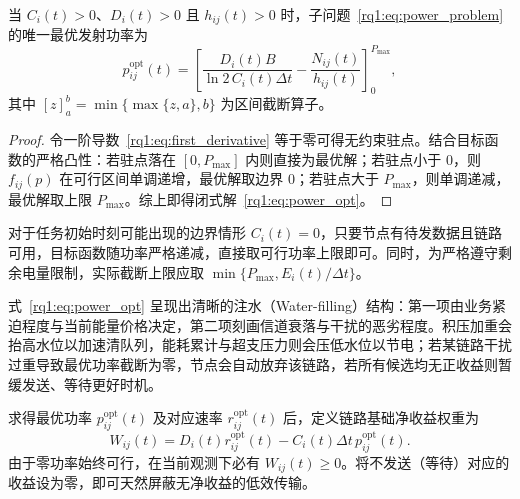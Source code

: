 \begin{proposition}[固定干扰下的链路功率最优解]
\label{rq1:prop:power}
当 $C_i(t)>0$、$D_i(t)>0$ 且 $h_{ij}(t)>0$ 时，子问题~\eqref{rq1:eq:power_problem} 的唯一最优发射功率为
\begin{equation}
 p_{ij}^{\mathrm{opt}}(t)=
 \left[\frac{D_i(t)B}{\ln2\,C_i(t)\Delta t}
            -\frac{N_{ij}(t)}{h_{ij}(t)}\right]_{0}^{P_{\max}},
 \label{rq1:eq:power_opt}
\end{equation}
其中 $[z]_{a}^{b}=\min\{\max\{z,a\},b\}$ 为区间截断算子。
\end{proposition}
\begin{proof}
令一阶导数~\eqref{rq1:eq:first_derivative} 等于零可得无约束驻点。结合目标函数的严格凸性：若驻点落在 $[0,P_{\max}]$ 内则直接为最优解；若驻点小于 $0$，则 $f_{ij}(p)$ 在可行区间单调递增，最优解取边界 $0$；若驻点大于 $P_{\max}$，则单调递减，最优解取上限 $P_{\max}$。综上即得闭式解~\eqref{rq1:eq:power_opt}。
\end{proof}

对于任务初始时刻可能出现的边界情形 $C_i(t)=0$，只要节点有待发数据且链路可用，目标函数随功率严格递减，直接取可行功率上限即可。同时，为严格遵守剩余电量限制，实际截断上限应取 $\min\{P_{\max},E_i(t)/\Delta t\}$。

式~\eqref{rq1:eq:power_opt} 呈现出清晰的注水（Water-filling）结构：第一项由业务紧迫程度与当前能量价格决定，第二项刻画信道衰落与干扰的恶劣程度。积压加重会抬高水位以加速清队列，能耗累计与超支压力则会压低水位以节电；若某链路干扰过重导致最优功率截断为零，节点会自动放弃该链路，若所有候选均无正收益则暂缓发送、等待更好时机。

求得最优功率 $p_{ij}^{\mathrm{opt}}(t)$ 及对应速率 $r_{ij}^{\mathrm{opt}}(t)$ 后，定义链路基础净收益权重为
\begin{equation}
 W_{ij}(t)=D_i(t)r_{ij}^{\mathrm{opt}}(t)
                   -C_i(t)\Delta t\,p_{ij}^{\mathrm{opt}}(t).
 \label{rq1:eq:base_weight}
\end{equation}
由于零功率始终可行，在当前观测下必有 $W_{ij}(t)\ge0$。将不发送（等待）对应的收益设为零，即可天然屏蔽无净收益的低效传输。

